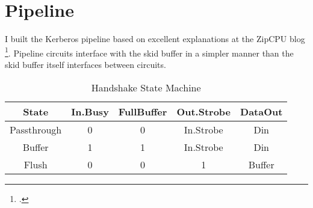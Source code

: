 \section{Pipeline}

I built the Kerberos pipeline based on excellent explanations at the ZipCPU blog \footcite{ZipCPU.Pipeline}.  Pipeline circuits interface with the skid buffer in a simpler manner than the skid buffer itself interfaces between circuits.

\begin{table}[ht]
    \caption{Handshake State Machine} %
    \centering %
    \begin{tabular}{c c c c c} %
        \hline\hline
        State & In.Busy & FullBuffer & Out.Strobe & DataOut \\ [0.5ex] %

        \hline
        Passthrough & 0 & 0 & In.Strobe & Din \\
        Buffer & 1 & 1 & In.Strobe & Din \\
        Flush & 0 & 0 & 1 & Buffer \\ [1ex]
        \hline
    \end{tabular}
    \label{table:pipeline-handshake-circuit-state}
\end{table}

